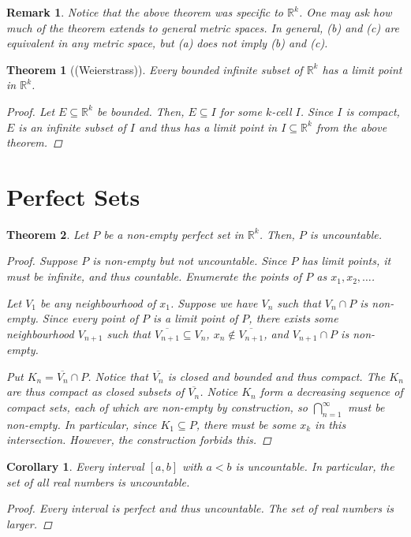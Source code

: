 \documentclass{scrbook}
\newcommand{\R}{\mathbb{R}}
\newtheorem{theorem}{Theorem}
\newtheorem{corollary}{Corollary}
\newtheorem*{remark}{Remark}
\begin{document}
\begin{remark}
Notice that the above theorem was specific to $\R^k$. One may ask how much of the theorem extends to general metric spaces. In general, (b) and (c) are equivalent in any metric space, but (a) does not imply (b) and (c).
\end{remark}

\begin{theorem}[(Weierstrass)]
Every bounded infinite subset of $\R^k$ has a limit point in $\R^k$. 

\begin{proof}
Let $E \subseteq \R^k$ be bounded. Then, $E \subseteq I$ for some $k$-cell $I$. Since $I$ is compact, $E$ is an infinite subset of $I$ and thus has a limit point in $I \subseteq \R^k$ from the above theorem.
\end{proof}
\end{theorem}

\section{Perfect Sets}

\begin{theorem}
Let $P$ be a non-empty perfect set in $\R^k$. Then, $P$ is uncountable. 

\begin{proof}
Suppose $P$ is non-empty but not uncountable. Since $P$ has limit points, it must be infinite, and thus countable. Enumerate the points of $P$ as $x_1, x_2, \dotsc$. 

Let $V_1$ be any neighbourhood of $x_1$. Suppose we have $V_n$ such that $V_n \cap P$ is non-empty. Since every point of $P$ is a limit point of $P$, there exists some neighbourhood $V_{n+1}$ such that $\overline{V_{n+1}} \subseteq V_n$, $x_n \not\in \overline{V_{n+1}}$, and $V_{n+1} \cap P$ is non-empty. 

Put $K_n = \overline{V_n} \cap P$. Notice that $\overline{V_n}$ is closed and bounded and thus compact. The $K_n$ are thus compact as closed subsets of $\overline{V_n}$. Notice $K_n$ form a decreasing sequence of compact sets, each of which are non-empty by construction, so $\bigcap_{n=1}^{\infty}$ must be non-empty. In particular, since $K_1 \subseteq P$, there must be some $x_k$ in this intersection. However, the construction forbids this.
\end{proof}
\end{theorem}

\begin{corollary}
Every interval $[a, b]$ with $a < b$ is uncountable. In particular, the set of all real numbers is uncountable.

\begin{proof}
Every interval is perfect and thus uncountable. The set of real numbers is larger.
\end{proof}
\end{corollary}
\end{document}
